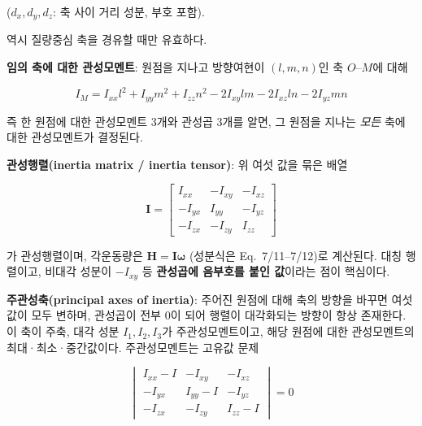             ($d_x, d_y, d_z$: 축 사이 거리 성분, 부호 포함).

            역시 질량중심 축을 경유할 때만 유효하다.

        \textbf{임의 축에 대한 관성모멘트}:
            원점을 지나고 방향여현이 $(l, m, n)$인 축 $O$--$M$에 대해

            \begin{equation}
                I_M = I_{xx}l^2 + I_{yy}m^2 + I_{zz}n^2
                - 2I_{xy}lm - 2I_{xz}ln - 2I_{yz}mn
            \end{equation}
    
            즉 한 원점에 대한 관성모멘트 3개와 관성곱 3개를 알면, 그 원점을 지나는 \emph{모든} 축에 대한 관성모멘트가 결정된다.

        \textbf{관성행렬(inertia matrix / inertia tensor)}:
            위 여섯 값을 묶은 배열
        
            \begin{equation}
                \mathbf{I} =
                \begin{bmatrix}
                    I_{xx} & -I_{xy} & -I_{xz} \\
                    -I_{yx} & I_{yy} & -I_{yz} \\
                    -I_{zx} & -I_{zy} & I_{zz}
                \end{bmatrix}
            \end{equation}

            가 관성행렬이며, 각운동량은 $\mathbf{H} = \mathbf{I}\boldsymbol{\omega}$ (성분식은 Eq.~7/11--7/12)로 계산된다. 대칭 행렬이고, 비대각 성분이 $-I_{xy}$ 등 \textbf{관성곱에 음부호를 붙인 값}이라는 점이 핵심이다.

        \textbf{주관성축(principal axes of inertia)}:
            주어진 원점에 대해 축의 방향을 바꾸면 여섯 값이 모두 변하며, 관성곱이 전부 0이 되어 행렬이 대각화되는 방향이 항상 존재한다. 이 축이 주축, 대각 성분 $I_1, I_2, I_3$가 주관성모멘트이고, 해당 원점에 대한 관성모멘트의 최대·최소·중간값이다. 주관성모멘트는 고유값 문제
    
            \begin{equation}
                \begin{vmatrix}
                    I_{xx} - I & -I_{xy} & -I_{xz} \\
                    -I_{yx} & I_{yy} - I & -I_{yz} \\
                    -I_{zx} & -I_{zy} & I_{zz} - I
                \end{vmatrix} = 0
            \end{equation}
        
